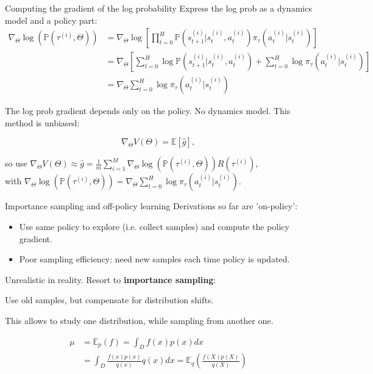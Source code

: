 \documentclass{beamer}
\begin{document}
\begin{frame}{Computing the gradient of the log probability}
  Express the log prob as a dynamics model and a policy part:
  \begin{align*}
    \nabla_{\Theta} \log \left( \mathbb{P}(\tau^{(i)}, \Theta) \right) &= \nabla_{\Theta} \log \left[ \prod_{t=0}^{H} \mathbb{P}(s_{t+1}^{(i)} | s_{t}^{(i)}, a_t^{(i)}) \pi_{\tau}(a_t^{(i)} | s_{t}^{(i)})  \right] \\
                                                                       &= \nabla_{\Theta} \left[ \sum_{t=0}^{H} \log \mathbb{P}(s_{t+1}^{(i)} | s_{t}^{(i)}, a_t^{(i)}) + \sum_{t=0}^{H} \log \pi_{\tau}(a_t^{(i)} | s_{t}^{(i)})  \right] \\
                                                                       &= \nabla_{\Theta} \sum_{t=0}^{H} \log \pi_{\tau}(a_t^{(i)} | s_{t}^{(i)})
  \end{align*}

  The log prob gradient depends only on the policy. No dynamics model. This method is unbiased:

    $$\nabla_{\Theta} V(\Theta) = \mathbb{E} \left[ \hat{g} \right],$$

  so use $ \nabla_{\Theta} V(\Theta) \approx \hat{g} = \frac{1}{m} \sum_{i=1}^{M} \nabla_{\Theta} \log \left( \mathbb{P}(\tau^{(i)}, \Theta) \right) R(\tau^{(i)})$, \\
  with $\nabla_{\Theta} \log \left( \mathbb{P}(\tau^{(i)}, \Theta) \right) = \nabla_{\Theta} \sum_{t=0}^{H} \log \pi_{\tau}(a_t^{(i)} | s_{t}^{(i)})$.

\end{frame}

\begin{frame}{Importance sampling and off-policy learning}
Derivations so far are 'on-policy':

\begin{itemize}
  \item Use same policy to explore (i.e. collect samples) and compute the policy gradient.
  \item Poor sampling efficiency: need new samples each time policy is updated.
\end{itemize}

Unrealistic in reality. Resort to \textbf{importance sampling}: 

\begin{center}
  Use old samples, but compensate for distribution shifts.
\end{center}

This allows to study one distribution, while sampling from another one.

\begin{align*}
  \mu &= \mathbb{E}_p(f) = \int_D f(x) p(x) dx \\
      &= \int_D \frac{f(x) p(x)}{q(x)} q(x) dx = \mathbb{E}_q \left( \frac{f(X)p(X)}{q(X)} \right)
\end{align*}

\end{frame}
\end{document}

